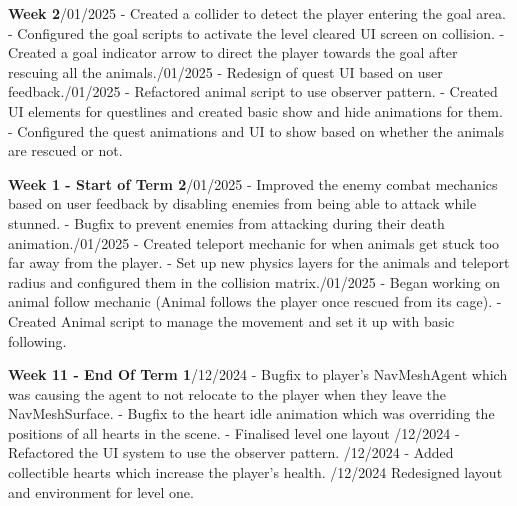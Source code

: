 \documentclass[10pt]{final_report}
\begin{document}
\textbf{Week 2}/01/2025
\newline- Created a collider to detect the player entering the goal area.
\newline- Configured the goal scripts to activate the level cleared UI screen on collision.
\newline- Created a goal indicator arrow to direct the player towards the goal after rescuing all the animals./01/2025
\newline- Redesign of quest UI based on user feedback./01/2025
\newline- Refactored animal script to use observer pattern.
\newline- Created UI elements for questlines and created basic show and hide animations for them.
\newline- Configured the quest animations and UI to show based on whether the animals are rescued or not.

\textbf{Week 1 - Start of Term 2}/01/2025
\newline- Improved the enemy combat mechanics based on user feedback by disabling enemies from being able to attack while stunned.
\newline- Bugfix to prevent enemies from attacking during their death animation./01/2025
\newline- Created teleport mechanic for when animals get stuck too far away from the player.
\newline- Set up new physics layers for the animals and teleport radius and configured them in the collision matrix./01/2025
\newline- Began working on animal follow mechanic (Animal follows the player once rescued from its cage).
\newline- Created Animal script to manage the movement and set it up with basic following.


\textbf{Week 11 - End Of Term 1}/12/2024
\newline- Bugfix to player's NavMeshAgent which was causing the agent to not relocate to the player when they leave the NavMeshSurface.
\newline- Bugfix to the heart idle animation which was overriding the positions of all hearts in the scene.
\newline- Finalised level one layout
/12/2024
\newline- Refactored the UI system to use the observer pattern.
/12/2024
\newline- Added collectible hearts which increase the player's health.
/12/2024
\newline Redesigned layout and environment for level one.
\end{document}
